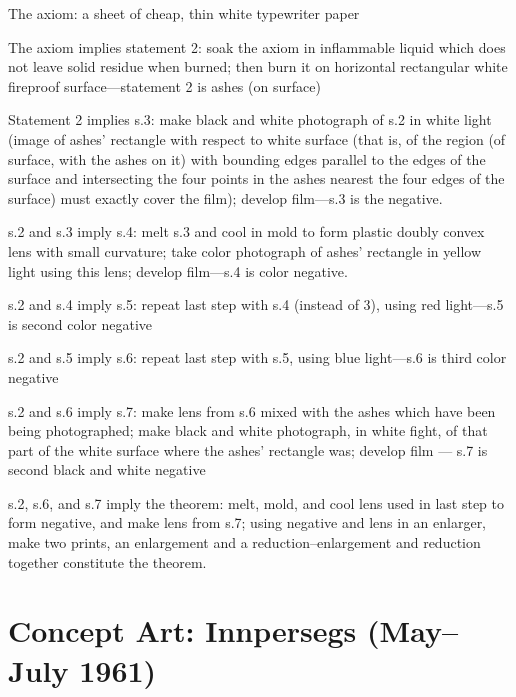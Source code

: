 \begin{sysrules}
The axiom: a sheet of cheap, thin white typewriter paper 

The axiom implies statement 2: soak the axiom in inflammable liquid which 
does not leave solid residue when burned; then burn it on horizontal 
rectangular white fireproof surface---statement 2 is ashes (on surface) 

Statement 2 implies s.3: make black and white photograph of s.2 in white 
light (image of ashes' rectangle with respect to white surface (that is, of the 
region (of surface, with the ashes on it) with bounding edges parallel to the 
edges of the surface and intersecting the four points in the ashes nearest the 
four edges of the surface) must exactly cover the film); develop film---s.3 is 
the negative.

s.2 and s.3 imply s.4: melt s.3 and cool in mold to form plastic doubly 
convex lens with small curvature; take color photograph of ashes' rectangle 
in yellow light using this lens; develop film---s.4 is color negative.

s.2 and s.4 imply s.5: repeat last step with s.4 (instead of 3), using red 
light---s.5 is second color negative 

s.2 and s.5 imply s.6: repeat last step with s.5, using blue light---s.6 is third 
color negative 

s.2 and s.6 imply s.7: make lens from s.6 mixed with the ashes which have 
been being photographed; make black and white photograph, in white fight, 
of that part of the white surface where the ashes' rectangle was; develop film 
--- s.7 is second black and white negative 

s.2, s.6, and s.7 imply the theorem: melt, mold, and cool lens used in last 
step to form negative, and make lens from s.7; using negative and lens in an 
enlarger, make two prints, an enlargement and a reduction--enlargement and 
reduction together constitute the theorem. 
\end{sysrules}

\section*{Concept Art: Innpersegs (May--July 1961)}

